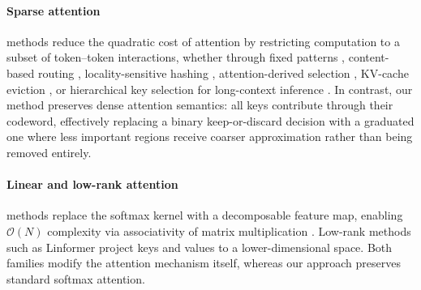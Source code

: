 \paragraph{Sparse attention}
methods reduce the quadratic cost of attention by restricting computation to a subset of token--token interactions, whether through fixed patterns \cite{beltagy2020longformerlongdocumenttransformer,child2019generatinglongsequencessparse}, content-based routing \cite{roy2021efficient}, locality-sensitive hashing \cite{kitaev2020reformer}, attention-derived selection \cite{yuan2025native}, KV-cache eviction \cite{li2024snapkv}, or hierarchical key selection for long-context inference \cite{hooper2025squeezed,mao2026icecache}.
In contrast, our method preserves dense attention semantics: all keys contribute through their codeword, effectively replacing a binary keep-or-discard decision with a graduated one where less important regions receive coarser approximation rather than being removed entirely.
\paragraph{Linear and low-rank attention}
methods replace the softmax kernel with a decomposable feature map, enabling $\mathcal{O}(N)$ complexity via associativity of matrix multiplication \cite{katharopoulos2020linear}. Low-rank methods such as Linformer \cite{wang2020linformer} project keys and values to a lower-dimensional space. Both families modify the attention mechanism itself, whereas our approach preserves standard softmax attention.
